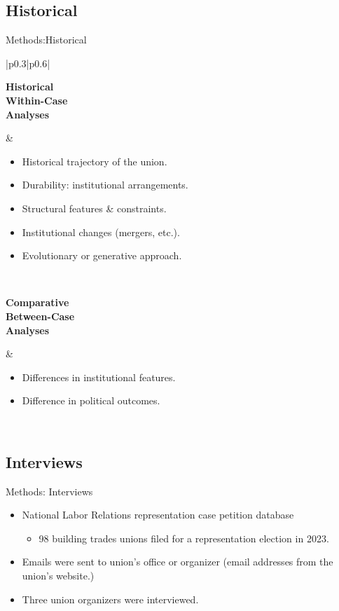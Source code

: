 \documentclass{beamer}
\begin{document}
\subsection{Historical}
\begin{frame}{Methods:Historical}
\setlength{\arrayrulewidth}{0.0pt} %
\begin{tabular}{|p{0.3\textwidth}|p{0.6\textwidth}|}
\hline
\begin{minipage}[t][0.2\textheight][t]{\linewidth}
\textbf{Historical\\
Within-Case\\
Analyses}
\end{minipage}
&
\begin{itemize}
    \item Historical trajectory of the union.
    \item Durability: institutional arrangements.
    \item Structural features \& constraints.
    \item Institutional changes (mergers, etc.).
    \item Evolutionary or generative approach. %
\end{itemize}
\\
\hline
\begin{minipage}[c][0.2\textheight][b]{\linewidth}
\textbf{Comparative\\
Between-Case\\
Analyses}
\end{minipage}
&
\begin{itemize}
    \item Differences in institutional features.
    \item Difference in political outcomes.
\end{itemize}
\\
\hline
\end{tabular}
\end{frame}

\subsection{Interviews}
\begin{frame}{Methods: Interviews}
\begin{itemize}
	\item National Labor Relations representation case petition database
	\begin{itemize}
		\item 98 building trades unions filed for a representation election in 2023.
	\end{itemize}		 
	\item Emails were sent to union's office or organizer (email addresses from the union's website.)
	\item Three union organizers were interviewed.
\end{itemize}
\end{frame}
\end{document}
